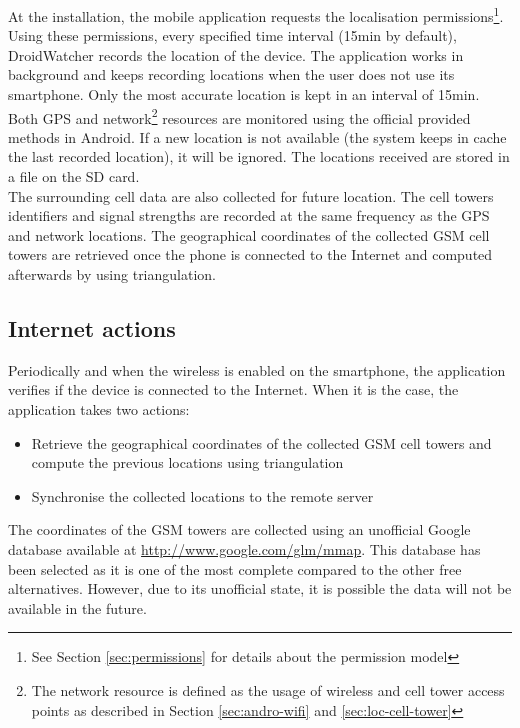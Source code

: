 At the installation, the mobile application requests the localisation permissions\footnote{See Section \ref{sec:permissions} for details about the permission model}.
Using these permissions, every specified time interval (15min by default), DroidWatcher records the location of the device.
The application works in background and keeps recording locations when the user does not use its smartphone.
Only the most accurate location is kept in an interval of 15min.
Both GPS and network\footnote{The network resource is defined as the usage of wireless and cell tower access points as described in Section \ref{sec:andro-wifi} and \ref{sec:loc-cell-tower}} resources are monitored using the official provided methods in Android.
If a new location is not available (the system keeps in cache the last recorded location), it will be ignored.
The locations received are stored in a file on the SD card.\\

The surrounding cell data are also collected for future location.
The cell towers identifiers and signal strengths are recorded at the same frequency as the GPS and network locations.
The geographical coordinates of the collected GSM cell towers are retrieved once the phone is connected to the Internet and computed afterwards by using triangulation.

\subsection{Internet actions}
\label{sec:dw-internet-actions}

Periodically and when the wireless is enabled on the smartphone, the application verifies if the device is connected to the Internet.
When it is the case, the application takes two actions:

\begin{itemize}
\item Retrieve the geographical coordinates of the collected GSM cell towers and compute the previous locations using triangulation
\item Synchronise the collected locations to the remote server
\end{itemize}

The coordinates of the GSM towers are collected using an unofficial Google database available at \url{http://www.google.com/glm/mmap}.
This database has been selected as it is one of the most complete compared to the other free alternatives.
However, due to its unofficial state, it is possible the data will not be available in the future.\\

